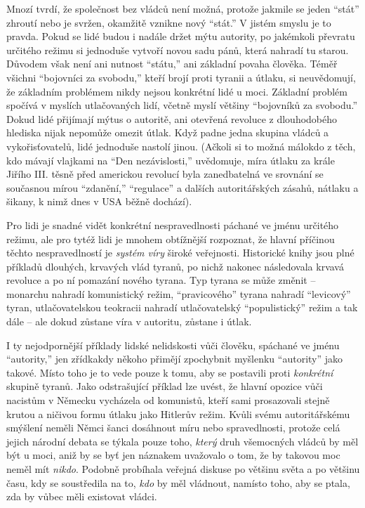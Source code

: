 \documentclass{book}
\begin{document}
Mnozí tvrdí, že společnost bez vládců není možná, protože jakmile se jeden \enquote{stát} zhroutí nebo je svržen, okamžitě vznikne nový \enquote{stát.} V jistém smyslu je to pravda. Pokud se lidé budou i nadále držet mýtu autority, po jakémkoli převratu určitého režimu si jednoduše vytvoří novou sadu pánů, která nahradí tu starou. Důvodem však není ani nutnost \enquote{státu,} ani základní povaha člověka. Téměř všichni \enquote{bojovníci za svobodu,} kteří brojí proti tyranii a útlaku, si neuvědomují, že základním problémem nikdy nejsou konkrétní lidé u moci. Základní problém spočívá v myslích utlačovaných lidí, včetně myslí většiny \enquote{bojovníků za svobodu.} Dokud lidé přijímají mýtus o autoritě, ani otevřená revoluce z dlouhodobého hlediska nijak nepomůže omezit útlak. Když padne jedna skupina vládců a vykořisťovatelů, lidé jednoduše nastolí jinou. (Ačkoli si to možná málokdo z těch, kdo mávají vlajkami na \enquote{Den nezávislosti,} uvědomuje, míra útlaku za krále Jiřího III. těsně před americkou revolucí byla zanedbatelná ve srovnání se současnou mírou \enquote{zdanění,} \enquote{regulace} a dalších autoritářských zásahů, nátlaku a šikany, k nimž dnes v USA běžně dochází).

Pro lidi je snadné vidět konkrétní nespravedlnosti páchané ve jménu určitého režimu, ale pro tytéž lidi je mnohem obtížnější rozpoznat, že hlavní příčinou těchto nespravedlností je \emph{systém víry} široké veřejnosti. Historické knihy jsou plné příkladů dlouhých, krvavých vlád tyranů, po nichž nakonec následovala krvavá revoluce a po ní pomazání nového tyrana. Typ tyrana se může změnit -- monarchu nahradí komunistický režim, \enquote{pravicového} tyrana nahradí \enquote{levicový} tyran, utlačovatelskou teokracii nahradí utlačovatelský \enquote{populistický} režim a tak dále -- ale dokud zůstane víra v autoritu, zůstane i útlak.

I ty nejodpornější příklady lidské nelidskosti vůči člověku, spáchané ve jménu \enquote{autority,} jen zřídkakdy někoho přimějí zpochybnit myšlenku \enquote{autority} jako takové. Místo toho je to vede pouze k tomu, aby se postavili proti \emph{konkrétní} skupině tyranů. Jako odstrašující příklad lze uvést, že hlavní opozice vůči nacistům v Německu vycházela od komunistů, kteří sami prosazovali stejně krutou a ničivou formu útlaku jako Hitlerův režim. Kvůli svému autoritářskému smýšlení neměli Němci šanci dosáhnout míru nebo spravedlnosti, protože celá jejich národní debata se týkala pouze toho, \emph{který} druh všemocných vládců by měl být u moci, aniž by se byť jen náznakem uvažovalo o tom, že by takovou moc neměl mít \emph{nikdo}. Podobně probíhala veřejná diskuse po většinu světa a po většinu času, kdy se soustředila na to, \emph{kdo} by měl vládnout, namísto toho, aby se ptala, zda by vůbec měli existovat vládci.
\end{document}
